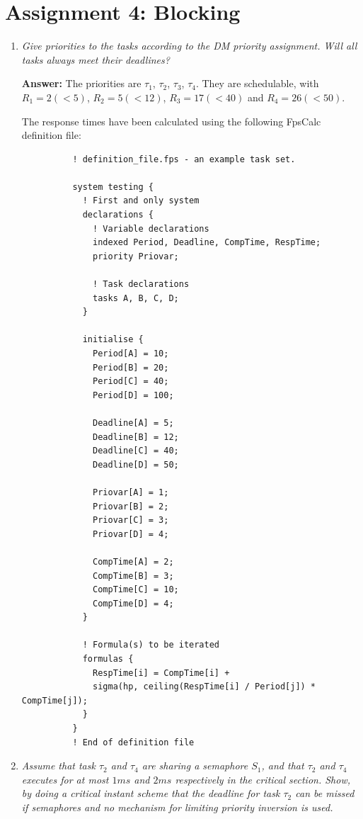 \documentclass[a4paper,10pt]{article}
\newcommand{\answer}{\textbf{Answer: }}
\begin{document}
\section{Assignment 4: Blocking}

\begin{enumerate}
	\item \emph{Give priorities to the tasks according to the DM priority assignment. Will all tasks always meet their deadlines?}
	
	\answer The priorities are $\tau_1$, $\tau_2$, $\tau_3$, $\tau_4$. They are schedulable, with $R_1 = 2 (<5)$, $R_2 = 5 (<12)$, $R_3 = 17 (< 40)$ and $R_4 = 26 (<50)$.

        The response times have been calculated using the following FpsCalc definition file:

        \begin{lstlisting}
          ! definition_file.fps - an example task set.
          
          system testing {
            ! First and only system
            declarations {		
              ! Variable declarations
              indexed Period, Deadline, CompTime, RespTime;
              priority Priovar;	
              
              ! Task declarations
              tasks A, B, C, D;
            }
            
            initialise {
              Period[A] = 10;
              Period[B] = 20;
              Period[C] = 40;
              Period[D] = 100;
              
              Deadline[A] = 5;
              Deadline[B] = 12;
              Deadline[C] = 40;
              Deadline[D] = 50;
              
              Priovar[A] = 1;
              Priovar[B] = 2;
              Priovar[C] = 3;
              Priovar[D] = 4;
              
              CompTime[A] = 2;
              CompTime[B] = 3;
              CompTime[C] = 10;
              CompTime[D] = 4;
            }
            
            ! Formula(s) to be iterated
            formulas {
              RespTime[i] = CompTime[i] +
              sigma(hp, ceiling(RespTime[i] / Period[j]) * CompTime[j]);
            }
          }				   
          ! End of definition file
        \end{lstlisting}

	\item \emph{Assume that task $\tau_2$ and $\tau_4$ are sharing a semaphore $S_1$, and that $\tau_2$ and $\tau_4$ executes for at most $1 ms$ and $2 ms$ respectively in the critical section. Show, by doing a critical instant scheme that the deadline for task $\tau_2$ can be missed if semaphores and no mechanism for limiting priority inversion is used.}
	

\end{enumerate}
\end{document}
